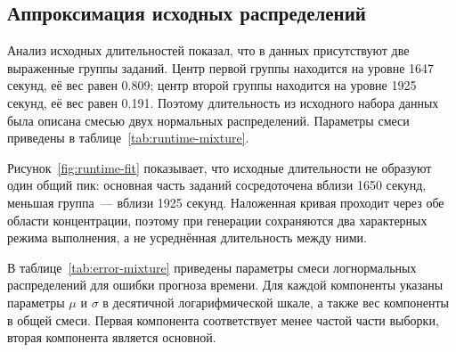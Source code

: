 \subsection{Аппроксимация исходных распределений}

Анализ исходных длительностей показал, что в данных присутствуют две выраженные группы заданий. Центр первой группы находится на уровне 1647 секунд, её вес равен 0.809; центр второй группы находится на уровне 1925 секунд, её вес равен 0.191. Поэтому длительность из исходного набора данных была описана смесью двух нормальных распределений. Параметры смеси приведены в таблице~\ref{tab:runtime-mixture}.

\begin{table}[H]
    \centering
    \caption{Параметры смеси нормальных распределений исходной длительности}
    \label{tab:runtime-mixture}
\end{table}


Рисунок~\ref{fig:runtime-fit} показывает, что исходные длительности не образуют один общий пик: основная часть заданий сосредоточена вблизи 1650 секунд, меньшая группа~--- вблизи 1925 секунд. Наложенная кривая проходит через обе области концентрации, поэтому при генерации сохраняются два характерных режима выполнения, а не усреднённая длительность между ними.


В таблице~\ref{tab:error-mixture} приведены параметры смеси логнормальных распределений для ошибки прогноза времени. Для каждой компоненты указаны параметры $\mu$ и $\sigma$ в десятичной логарифмической шкале, а также вес компоненты в общей смеси. Первая компонента соответствует менее частой части выборки, вторая компонента является основной.

\begin{table}[H]
    \centering
    \caption{Параметры смеси логнормальных распределений ошибки прогноза}
    \label{tab:error-mixture}
\end{table}

